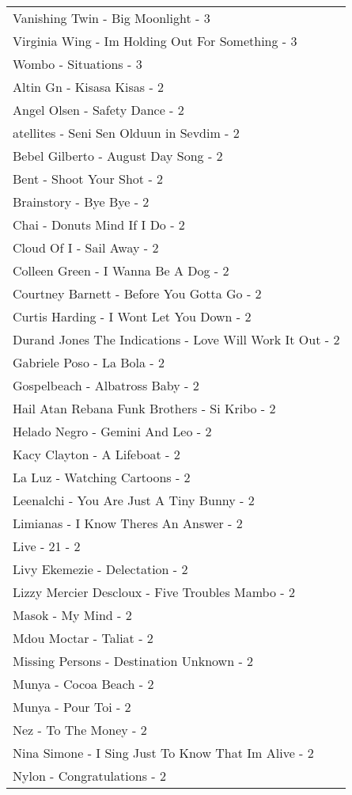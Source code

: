 \documentclass[
]{article}
\begin{document}
\begin{longtable}{l}
Vanishing Twin - Big Moonlight - 3 \\ 
Virginia Wing - Im Holding Out For Something - 3 \\ 
Wombo - Situations - 3 \\ 
Altin Gn - Kisasa Kisas - 2 \\ 
Angel Olsen - Safety Dance - 2 \\ 
atellites - Seni Sen Olduun in Sevdim - 2 \\ 
Bebel Gilberto - August Day Song - 2 \\ 
Bent - Shoot Your Shot - 2 \\ 
Brainstory - Bye Bye - 2 \\ 
Chai - Donuts Mind If I Do - 2 \\ 
Cloud Of I - Sail Away - 2 \\ 
Colleen Green - I Wanna Be A Dog - 2 \\ 
Courtney Barnett - Before You Gotta Go - 2 \\ 
Curtis Harding - I Wont Let You Down - 2 \\ 
Durand Jones The Indications - Love Will Work It Out - 2 \\ 
Gabriele Poso - La Bola - 2 \\ 
Gospelbeach - Albatross Baby - 2 \\ 
Hail Atan Rebana Funk Brothers - Si Kribo - 2 \\ 
Helado Negro - Gemini And Leo - 2 \\ 
Kacy Clayton - A Lifeboat - 2 \\ 
La Luz - Watching Cartoons - 2 \\ 
Leenalchi - You Are Just A Tiny Bunny - 2 \\ 
Limianas - I Know Theres An Answer - 2 \\ 
Live - 21 - 2 \\ 
Livy Ekemezie - Delectation - 2 \\ 
Lizzy Mercier Descloux - Five Troubles Mambo - 2 \\ 
Masok - My Mind - 2 \\ 
Mdou Moctar - Taliat - 2 \\ 
Missing Persons - Destination Unknown - 2 \\ 
Munya - Cocoa Beach - 2 \\ 
Munya - Pour Toi - 2 \\ 
Nez - To The Money - 2 \\ 
Nina Simone - I Sing Just To Know That Im Alive - 2 \\ 
Nylon - Congratulations - 2 \\ 

\end{longtable}
\end{document}
